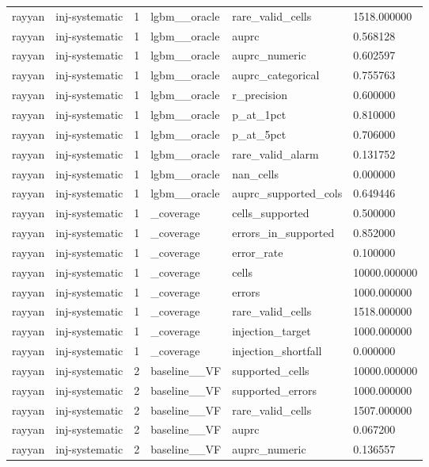 \begin{tabular}{llllll}
rayyan & inj-systematic & 1 & lgbm\_\_oracle & rare\_valid\_cells & 1518.000000 \\
rayyan & inj-systematic & 1 & lgbm\_\_oracle & auprc & 0.568128 \\
rayyan & inj-systematic & 1 & lgbm\_\_oracle & auprc\_numeric & 0.602597 \\
rayyan & inj-systematic & 1 & lgbm\_\_oracle & auprc\_categorical & 0.755763 \\
rayyan & inj-systematic & 1 & lgbm\_\_oracle & r\_precision & 0.600000 \\
rayyan & inj-systematic & 1 & lgbm\_\_oracle & p\_at\_1pct & 0.810000 \\
rayyan & inj-systematic & 1 & lgbm\_\_oracle & p\_at\_5pct & 0.706000 \\
rayyan & inj-systematic & 1 & lgbm\_\_oracle & rare\_valid\_alarm & 0.131752 \\
rayyan & inj-systematic & 1 & lgbm\_\_oracle & nan\_cells & 0.000000 \\
rayyan & inj-systematic & 1 & lgbm\_\_oracle & auprc\_supported\_cols & 0.649446 \\
rayyan & inj-systematic & 1 & \_coverage & cells\_supported & 0.500000 \\
rayyan & inj-systematic & 1 & \_coverage & errors\_in\_supported & 0.852000 \\
rayyan & inj-systematic & 1 & \_coverage & error\_rate & 0.100000 \\
rayyan & inj-systematic & 1 & \_coverage & cells & 10000.000000 \\
rayyan & inj-systematic & 1 & \_coverage & errors & 1000.000000 \\
rayyan & inj-systematic & 1 & \_coverage & rare\_valid\_cells & 1518.000000 \\
rayyan & inj-systematic & 1 & \_coverage & injection\_target & 1000.000000 \\
rayyan & inj-systematic & 1 & \_coverage & injection\_shortfall & 0.000000 \\
rayyan & inj-systematic & 2 & baseline\_\_VF & supported\_cells & 10000.000000 \\
rayyan & inj-systematic & 2 & baseline\_\_VF & supported\_errors & 1000.000000 \\
rayyan & inj-systematic & 2 & baseline\_\_VF & rare\_valid\_cells & 1507.000000 \\
rayyan & inj-systematic & 2 & baseline\_\_VF & auprc & 0.067200 \\
rayyan & inj-systematic & 2 & baseline\_\_VF & auprc\_numeric & 0.136557 \\

\end{tabular}
